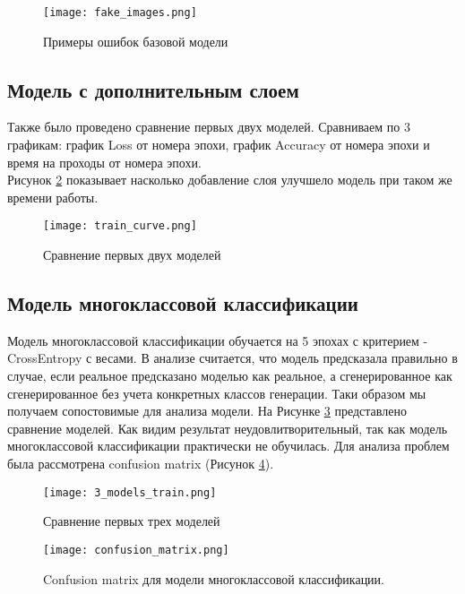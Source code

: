 \documentclass{article}
\begin{document}
\begin{figure}[ht]
    \centering
    \texttt{[image: fake\_images.png]}
    \caption{Примеры ошибок базовой модели}
    \label{fig:fake_image}
\end{figure}


\subsection{Модель с дополнительным слоем}
Также было проведено сравнение первых двух моделей. Сравниваем по 3 графикам: график Loss от номера эпохи, график Accuracy от номера эпохи и время на проходы от номера эпохи. \\
Рисунок \ref{fig:2_models_train} показывает насколько добавление слоя улучшело модель при таком же времени работы.

\begin{figure}[ht]
    \centering
    \texttt{[image: train\_curve.png]}
    \caption{Сравнение первых двух моделей}
    \label{fig:2_models_train}
\end{figure}


\subsection{Модель многоклассовой классификации}
Модель многоклассовой классификации обучается на 5 эпохах с критерием - CrossEntropy с весами. В анализе считается, что модель предсказала правильно в случае, если реальное предсказано моделью как реальное, а сгенерированное как сгенерированное без учета конкретных классов генерации. Таки образом мы получаем сопостовимые для анализа модели. На Рисунке \ref{fig:3_models_train} представлено сравнение моделей. Как видим результат неудовлитворительный, так как модель многоклассовой классификации практически не обучилась. Для анализа проблем была рассмотрена confusion matrix (Рисунок \ref{fig:confusion}).

\begin{figure}[ht]
    \centering
    \texttt{[image: 3\_models\_train.png]}
    \caption{Сравнение первых трех моделей}
    \label{fig:3_models_train}
\end{figure}

\begin{figure}[ht]
    \centering
    \texttt{[image: confusion\_matrix.png]}
    \caption{Confusion matrix для модели многоклассовой классификации.}
    \label{fig:confusion}
\end{figure}



\end{document}
